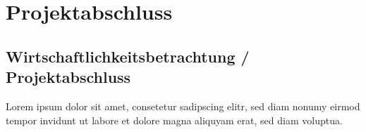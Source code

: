 
\chapter{Projektabschluss} 
\section{Wirtschaftlichkeitsbetrachtung / Projektabschluss}
Lorem ipsum dolor sit amet, consetetur sadipscing elitr, sed diam nonumy eirmod tempor invidunt ut labore et dolore magna aliquyam erat, sed diam voluptua. 